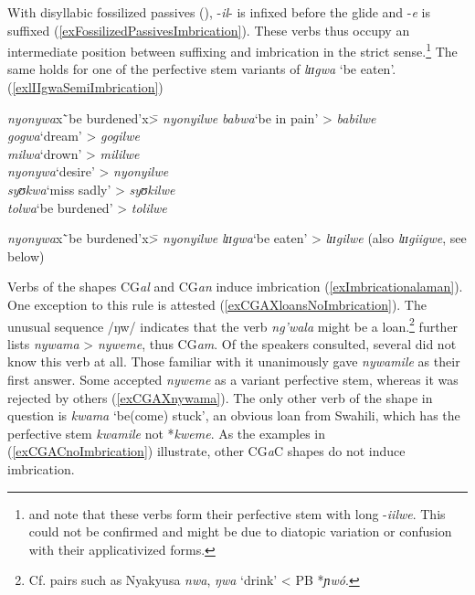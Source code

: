 \largerpage
With disyllabic fossilized passives (), -\textit{il}- is infixed before the glide and -\textit{e} is suffixed (\ref{exFossilizedPassivesImbrication}). These verbs thus occupy an intermediate position between suffixing and imbrication in the strict sense.\footnote{\citet{SchumannK1899} and \citet{BergerP1938} note that these verbs form their perfective stem with long -\textit{iilwe}. This could not be confirmed and might be due to diatopic variation or confusion with their applicativized forms.} The same holds for one of the perfective stem variants of \textit{lɪɪgwa} \lq be eaten'. (\ref{exlIIgwaSemiImbrication})
\begin{exe}
\ex\label{exFossilizedPassivesImbrication}
\begin{tabbing}
\textit{nyonywa}x\=`be burdened'x\= > \textit{nyonyilwe}\kill
\textit{babwa}\>`be in pain'\> > \textit{babilwe}\\ 
\textit{gogwa}\>`dream'\> > \textit{gogilwe}\\
\textit{milwa}\>`drown'\> > \textit{mililwe}\\
\textit{nyonywa}\>`desire'\> > \textit{nyonyilwe}\\
\textit{syʊkwa}\>`miss sadly'\> > \textit{syʊkilwe}\\
\textit{tolwa}\>`be burdened'\> > \textit{tolilwe}
\end{tabbing}
\ex \label{exlIIgwaSemiImbrication}
\begin{tabbing}
\textit{nyonywa}x\=`be burdened'x\= > \textit{nyonyilwe}\kill
\textit{lɪɪgwa}\>`be eaten'\> > \textit{lɪɪgilwe} (also \textit{lɪɪgiigwe}, see below)
\end{tabbing}
\end{exe}

Verbs of the shapes CG\textit{al} and CG\textit{an} induce imbrication (\ref{exImbricationalaman}). One exception to this rule is attested (\ref{exCGAXloansNoImbrication}). The unusual sequence /ŋw/ indicates that the verb \textit{ng'wala} might be a  loan.\footnote{Cf. pairs such as Nyakyusa \textit{nwa},  \textit{ŋwa} \lq drink' < PB *\textit{ɲwó}.} \citet{BergerP1938} further lists \textit{nywama} > \textit{nyweme}, thus CG\textit{am}. Of the speakers consulted, several did not know this verb at all. Those familiar with it unanimously gave \textit{nywamile} as their first answer. Some accepted \textit{nyweme} as a variant perfective stem, whereas it was rejected by others (\ref{exCGAXnywama}). The only other verb of the shape in question is \textit{kwama} \lq be(come) stuck', an obvious loan from Swahili, which has the perfective stem \textit{kwamile}  not *\textit{kweme}. As the examples in (\ref{exCGACnoImbrication}) illustrate, other CG\textit{a}C shapes do not induce imbrication.

